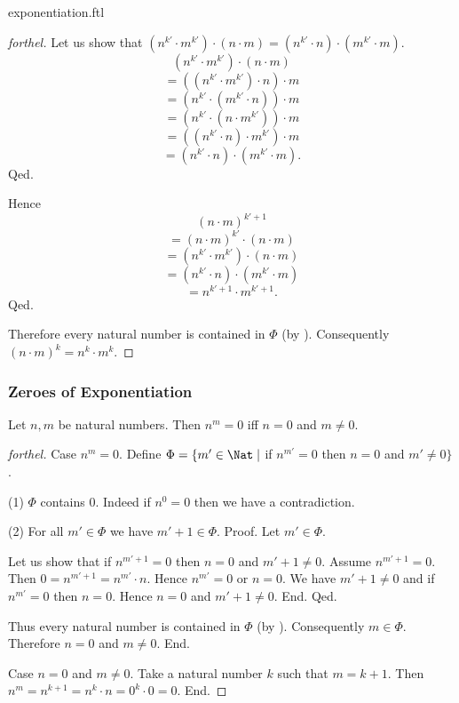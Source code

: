 \documentclass{naproche-library}
\begin{document}
\begin{smodule}{exponentiation.ftl}
\begin{proof}[forthel]
      Let us show that $(n^{k'} \cdot m^{k'}) \cdot (n \cdot m) = (n^{k'} \cdot n) \cdot (m^{k'} \cdot m)$.
        \[  (n^{k'} \cdot m^{k'}) \cdot (n \cdot m)       \]
        \[    = ((n^{k'} \cdot m^{k'}) \cdot n) \cdot m   \]
        \[    = (n^{k'} \cdot (m^{k'} \cdot n)) \cdot m   \]
        \[    = (n^{k'} \cdot (n \cdot m^{k'})) \cdot m   \]
        \[    = ((n^{k'} \cdot n) \cdot m^{k'}) \cdot m   \]
        \[    = (n^{k'} \cdot n) \cdot (m^{k'} \cdot m).  \]
      Qed.

      Hence
      \[  (n \cdot m)^{k' + 1}                          \]
      \[    = (n \cdot m)^{k'} \cdot (n \cdot m)        \]
      \[    = (n^{k'} \cdot m^{k'}) \cdot (n \cdot m)   \]
      \[    = (n^{k'} \cdot n) \cdot (m^{k'} \cdot m)   \]
      \[    = n^{k' + 1} \cdot m^{k' + 1}.              \]
    Qed.

    Therefore every natural number is contained in $\Phi$ (by ).
    Consequently $(n \cdot m)^{k} = n^{k} \cdot m^{k}$.
  \end{proof}


  \subsubsection*{Zeroes of Exponentiation}

  \begin{proposition}[forthel,id=ARITHMETIC_09_3860221447372800]
    Let $n, m$ be natural numbers.
    Then $n^{m} = 0$ iff $n = 0$ and $m \neq 0$.
  \end{proposition}
  \begin{proof}[forthel]
    Case $n^{m} = 0$.
      Define $\Phi = \{ m' \in \Nat \mid$ if $n^{m'} = 0$ then $n = 0$ and $m' \neq 0 \}$.

      (1) $\Phi$ contains $0$.
      Indeed if $n^{0} = 0$ then we have a contradiction.

      (2) For all $m' \in \Phi$ we have $m' + 1 \in \Phi$. \newline
      Proof.
        Let $m' \in \Phi$.

        Let us show that if $n^{m' + 1} = 0$ then $n = 0$ and $m' + 1 \neq 0$.
          Assume $n^{m' + 1} = 0$.
          Then $0 = n^{m' + 1} = n^{m'} \cdot n$.
          Hence $n^{m'} = 0$ or $n = 0$.
          We have $m' + 1 \neq 0$ and if $n^{m'} = 0$ then $n = 0$.
          Hence $n = 0$ and $m' + 1 \neq 0$.
        End.
      Qed.

      Thus every natural number is contained in $\Phi$ (by ).
      Consequently $m \in \Phi$.
      Therefore $n = 0$ and $m \neq 0$.
    End.

    Case $n = 0$ and $m \neq 0$.
      Take a natural number $k$ such that $m = k + 1$.
      Then $n^{m}
        = n^{k + 1}
        = n^{k} \cdot n
        = 0^{k} \cdot 0
        = 0$.
    End.
  \end{proof}
\end{smodule}
\end{document}
